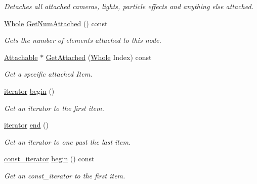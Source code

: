 \begin{DoxyCompactItemize}
\begin{DoxyCompactList}\small\item\em Detaches all attached cameras, lights, particle effects and anything else attached. \item\end{DoxyCompactList}\item 
\hyperlink{namespacephys_a460f6bc24c8dd347b05e0366ae34f34a}{Whole} \hyperlink{classphys_1_1WorldNode_a409eca3c9a924f1485e1c25c7d60e43d}{GetNumAttached} () const 
\begin{DoxyCompactList}\small\item\em Gets the number of elements attached to this node. \item\end{DoxyCompactList}\item 
\hyperlink{classphys_1_1Attachable}{Attachable} $\ast$ \hyperlink{classphys_1_1WorldNode_ad29bcbb80647d3a792af6578e6bc4c13}{GetAttached} (\hyperlink{namespacephys_a460f6bc24c8dd347b05e0366ae34f34a}{Whole} Index) const 
\begin{DoxyCompactList}\small\item\em Get a specific attached Item. \item\end{DoxyCompactList}\item 
\hyperlink{classphys_1_1WorldNode_ad7f553f256c4e500e35c36196db26287}{iterator} \hyperlink{classphys_1_1WorldNode_a3ea7e2d0a4191a936ac9bd4fb2671a97}{begin} ()
\begin{DoxyCompactList}\small\item\em Get an iterator to the first item. \item\end{DoxyCompactList}\item 
\hyperlink{classphys_1_1WorldNode_ad7f553f256c4e500e35c36196db26287}{iterator} \hyperlink{classphys_1_1WorldNode_ad71a9f4e8aa60767997e900a1fd80051}{end} ()
\begin{DoxyCompactList}\small\item\em Get an iterator to one past the last item. \item\end{DoxyCompactList}\item 
\hyperlink{classphys_1_1WorldNode_a76139100e549fd31310cd1bed75338ba}{const\_\-iterator} \hyperlink{classphys_1_1WorldNode_ac42af926430269aeb7d31b2753bb08d5}{begin} () const 
\begin{DoxyCompactList}\small\item\em Get an const\_\-iterator to the first item. \item\end{DoxyCompactList}\item 

\end{DoxyCompactItemize}
